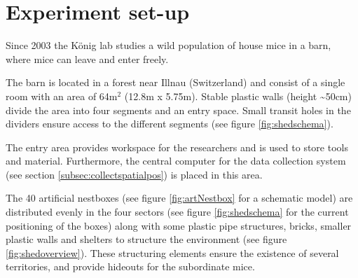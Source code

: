 \newpage
\section{Experiment set-up}
\label{sec:shedsetup}

Since 2003 the K\"onig lab studies a wild population of house mice in a barn, where mice can leave and enter freely.

The barn is located in a forest near Illnau (Switzerland) and consist of a single room with an area of 64m$^2$ (12.8m x 5.75m). Stable plastic walls (height \textasciitilde50cm) divide the area into four segments and an entry space. Small transit holes in the dividers ensure access to the different segments (see figure \ref{fig:shedschema}).

The entry area provides workspace for the researchers and is used to store tools and material. Furthermore, the central computer for the data collection system (see section \ref{subsec:collectspatialpos}) is placed in this area.

The 40 artificial nestboxes (see figure \ref{fig:artNestbox} for a schematic model) are distributed evenly in the four sectors (see figure \ref{fig:shedschema} for the current positioning of the boxes) along with some plastic pipe structures, bricks, smaller plastic walls and shelters to structure the environment (see figure \ref{fig:shedoverview}). These structuring elements ensure the existence of several territories, and provide hideouts for the subordinate mice.


